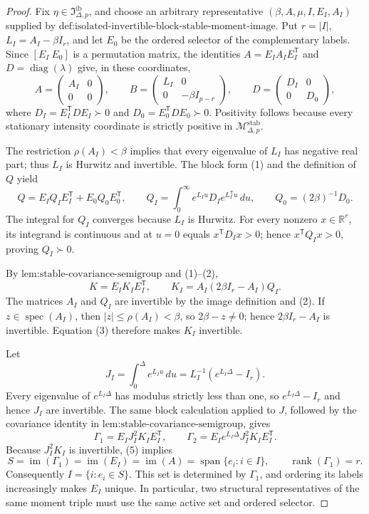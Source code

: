 \documentclass{article}
\begin{document}
\begin{proof}
Fix \(\eta\in\mathfrak I_{\Delta,p}^{\mathrm{ib}}\), and choose an arbitrary representative \((\beta,A,\mu,I,E_I,A_I)\) supplied by \(\text{def:isolated-invertible-block-stable-moment-image}\).  Put \(r=|I|\), \(L_I=A_I-\beta I_r\), and let \(E_0\) be the ordered selector of the complementary labels.  Since \([E_I\ E_0]\) is a permutation matrix, the identities \(A=E_IA_IE_I^{\mathsf T}\) and \(D=\operatorname{diag}(\lambda)\) give, in these coordinates,
\[
 A=\begin{pmatrix}A_I&0\\0&0\end{pmatrix},\qquad
 B=\begin{pmatrix}L_I&0\\0&-\beta I_{p-r}\end{pmatrix},\qquad
 D=\begin{pmatrix}D_I&0\\0&D_0\end{pmatrix},
\tag{1}
\]
where \(D_I=E_I^{\mathsf T}DE_I\succ0\) and \(D_0=E_0^{\mathsf T}DE_0\succ0\).  Positivity follows because every stationary intensity coordinate is strictly positive in \(\mathcal M_{\Delta,p}^{\mathrm{stab}}\).

The restriction \(\rho(A_I)<\beta\) implies that every eigenvalue of \(L_I\) has negative real part; thus \(L_I\) is Hurwitz and invertible.  The block form (1) and the definition of \(Q\) yield
\[
 Q=E_IQ_IE_I^{\mathsf T}+E_0Q_0E_0^{\mathsf T},\qquad
 Q_I=\int_0^\infty e^{L_Iu}D_Ie^{L_I^{\mathsf T}u}\,du,\qquad
 Q_0=(2\beta)^{-1}D_0.
\tag{2}
\]
The integral for \(Q_I\) converges because \(L_I\) is Hurwitz.  For every nonzero \(x\in\mathbb R^r\), its integrand is continuous and at \(u=0\) equals \(x^{\mathsf T}D_Ix>0\); hence \(x^{\mathsf T}Q_Ix>0\), proving \(Q_I\succ0\).

By \(\text{lem:stable-covariance-semigroup}\) and (1)--(2),
\[
 K=E_IK_IE_I^{\mathsf T},\qquad
 K_I=A_I(2\beta I_r-A_I)Q_I.
\tag{3}
\]
The matrices \(A_I\) and \(Q_I\) are invertible by the image definition and (2).  If \(z\in\operatorname{spec}(A_I)\), then \(|z|\leq\rho(A_I)<\beta\), so \(2\beta-z\neq0\); hence \(2\beta I_r-A_I\) is invertible.  Equation (3) therefore makes \(K_I\) invertible.

Let
\[
 J_I=\int_0^\Delta e^{L_Iu}\,du=L_I^{-1}(e^{L_I\Delta}-I_r).
\tag{4}
\]
Every eigenvalue of \(e^{L_I\Delta}\) has modulus strictly less than one, so \(e^{L_I\Delta}-I_r\) and hence \(J_I\) are invertible.  The same block calculation applied to \(J\), followed by the covariance identity in \(\text{lem:stable-covariance-semigroup}\), gives
\[
 \Gamma_1=E_IJ_I^2K_IE_I^{\mathsf T},\qquad
 \Gamma_2=E_Ie^{L_I\Delta}J_I^2K_IE_I^{\mathsf T}.
\tag{5}
\]
Because \(J_I^2K_I\) is invertible, (5) implies
\[
 S=\operatorname{im}(\Gamma_1)=\operatorname{im}(E_I)
 =\operatorname{im}(A)=\operatorname{span}\{e_i:i\in I\},\qquad
 \operatorname{rank}(\Gamma_1)=r.
\tag{6}
\]
Consequently \(I=\{i:e_i\in S\}\).  This set is determined by \(\Gamma_1\), and ordering its labels increasingly makes \(E_I\) unique.  In particular, two structural representatives of the same moment triple must use the same active set and ordered selector.


\end{proof}
\end{document}
